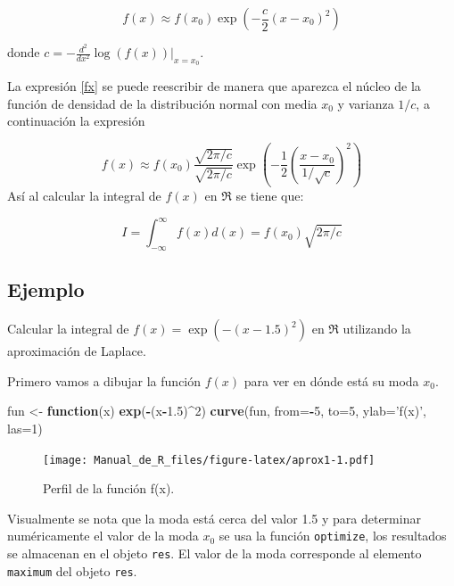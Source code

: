 \documentclass[10pt,]{krantz}
\makeatletter
\newenvironment{Shaded}{\begin{snugshade}}{\end{snugshade}}
\newcommand{\KeywordTok}[1]{\textcolor[rgb]{0.13,0.29,0.53}{\textbf{#1}}}
\newcommand{\DataTypeTok}[1]{\textcolor[rgb]{0.13,0.29,0.53}{#1}}
\newcommand{\DecValTok}[1]{\textcolor[rgb]{0.00,0.00,0.81}{#1}}
\newcommand{\FloatTok}[1]{\textcolor[rgb]{0.00,0.00,0.81}{#1}}
\newcommand{\StringTok}[1]{\textcolor[rgb]{0.31,0.60,0.02}{#1}}
\newcommand{\ControlFlowTok}[1]{\textcolor[rgb]{0.13,0.29,0.53}{\textbf{#1}}}
\newcommand{\OperatorTok}[1]{\textcolor[rgb]{0.81,0.36,0.00}{\textbf{#1}}}
\newcommand{\NormalTok}[1]{#1}
\newenvironment{kframe}{%
\medskip{}
\setlength{\fboxsep}{.8em}
 \def\at@end@of@kframe{}%
 \ifinner\ifhmode%
  \def\at@end@of@kframe{\end{minipage}}%
  \begin{minipage}{\columnwidth}%
 \fi\fi%
 \def\FrameCommand##1{\hskip\@totalleftmargin \hskip-\fboxsep
 \colorbox{shadecolor}{##1}\hskip-\fboxsep
     \hskip-\linewidth \hskip-\@totalleftmargin \hskip\columnwidth}%
 \MakeFramed {\advance\hsize-\width
   \@totalleftmargin\z@ \linewidth\hsize
   \@setminipage}}%
 {\par\unskip\endMakeFramed%
 \at@end@of@kframe}
\renewenvironment{Shaded}{\begin{kframe}}{\end{kframe}}
\makeatother
\begin{document}
\begin{equation} \label{fx}
f(x) \approx f(x_0)  \exp \left( -\frac{c}{2} (x-x_0)^2 \right)
\end{equation}

donde \(c=-\frac{d^2}{dx^2} \log(f(x)) \bigg|_{x=x_0}\).

La expresión \ref{fx} se puede reescribir de manera que aparezca el
núcleo de la función de densidad de la distribución normal con media
\(x_0\) y varianza \(1/c\), a continuación la expresión

\[
f(x) \approx f(x_0) \frac{\sqrt{2 \pi / c}}{\sqrt{2 \pi / c}}  \exp \left( -\frac{1}{2} \left( \frac{x-x_0}{1/\sqrt{c}} \right)^2 \right)
\] Así al calcular la integral de \(f(x)\) en \(\Re\) se tiene que:

\begin{equation} \label{aprox_laplace}
I = \int_{-\infty}^{\infty} f(x) d(x) = f(x_0) \sqrt{2 \pi / c}
\end{equation}

\subsection*{Ejemplo}\label{ejemplo-74}


Calcular la integral de \(f(x)=\exp \left( -(x-1.5)^2 \right)\) en
\(\Re\) utilizando la aproximación de Laplace.

Primero vamos a dibujar la función \(f(x)\) para ver en dónde está su
moda \(x_0\).

\begin{Shaded}
\begin{Highlighting}[]
\NormalTok{fun <-}\StringTok{ }\ControlFlowTok{function}\NormalTok{(x) }\KeywordTok{exp}\NormalTok{(}\OperatorTok{-}\NormalTok{(x}\OperatorTok{-}\FloatTok{1.5}\NormalTok{)}\OperatorTok{^}\DecValTok{2}\NormalTok{)}
\KeywordTok{curve}\NormalTok{(fun, }\DataTypeTok{from=}\OperatorTok{-}\DecValTok{5}\NormalTok{, }\DataTypeTok{to=}\DecValTok{5}\NormalTok{, }\DataTypeTok{ylab=}\StringTok{'f(x)'}\NormalTok{, }\DataTypeTok{las=}\DecValTok{1}\NormalTok{)}
\end{Highlighting}
\end{Shaded}

\begin{figure}
\centering
\texttt{[image: Manual\_de\_R\_files/figure-latex/aprox1-1.pdf]}
\caption{\label{fig:aprox1}Perfil de la función f(x).}
\end{figure}

Visualmente se nota que la moda está cerca del valor 1.5 y para
determinar numéricamente el valor de la moda \(x_0\) se usa la función
\texttt{optimize}, los resultados se almacenan en el objeto
\texttt{res}. El valor de la moda corresponde al elemento
\texttt{maximum} del objeto \texttt{res}.
\end{document}
